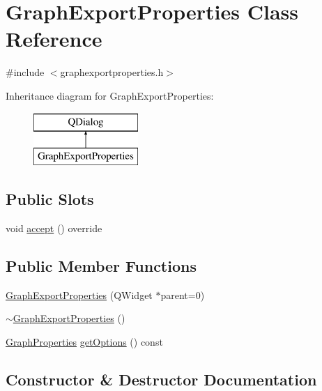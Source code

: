 \hypertarget{class_graph_export_properties}{}\section{Graph\+Export\+Properties Class Reference}
\label{class_graph_export_properties}


{\ttfamily \#include $<$graphexportproperties.\+h$>$}

Inheritance diagram for Graph\+Export\+Properties\+:\begin{figure}[H]
\begin{center}
\leavevmode
\includegraphics[height=2.000000cm]{d6/d0c/class_graph_export_properties}
\end{center}
\end{figure}
\subsection*{Public Slots}
\begin{DoxyCompactItemize}
\item 
void \mbox{\hyperlink{class_graph_export_properties_a00f998b75d197b0951f3196c4e077783}{accept}} () override
\end{DoxyCompactItemize}
\subsection*{Public Member Functions}
\begin{DoxyCompactItemize}
\item 
\mbox{\hyperlink{class_graph_export_properties_ab7780e3808ab11f28d3b8469c10b6037}{Graph\+Export\+Properties}} (Q\+Widget $\ast$parent=0)
\item 
\mbox{\hyperlink{class_graph_export_properties_a552acb3720297773c3f9dd5ca6295a76}{$\sim$\+Graph\+Export\+Properties}} ()
\item 
\mbox{\hyperlink{struct_graph_properties}{Graph\+Properties}} \mbox{\hyperlink{class_graph_export_properties_acd1307a08d8af201591f5c240da42a59}{get\+Options}} () const
\end{DoxyCompactItemize}


\subsection{Constructor \& Destructor Documentation}
\mbox{\label{class_graph_export_properties_ab7780e3808ab11f28d3b8469c10b6037}} 
